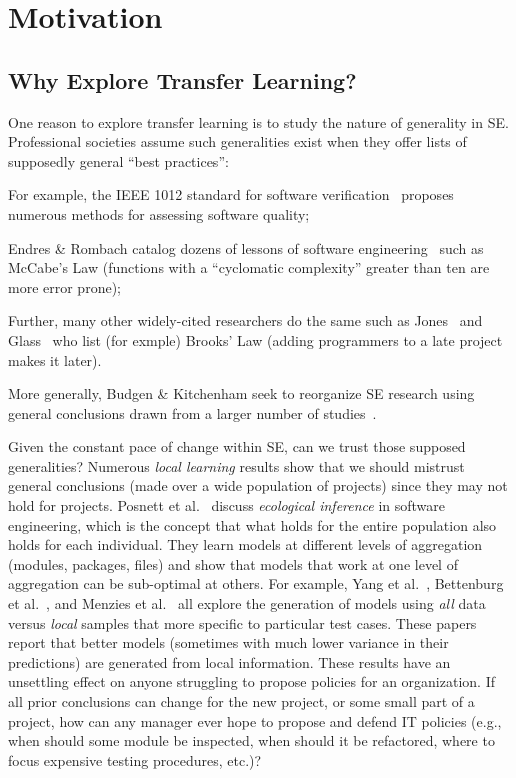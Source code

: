 \section{Motivation}
\label{sec:Motivation}

\subsection{Why Explore Transfer Learning?}
One reason to explore transfer learning
is to study the nature of
generality in SE.  Professional
societies assume such generalities exist when they
offer lists of supposedly general ``best practices'':
\squishlist
\item For example, the  IEEE 1012 standard for software
  verification~\cite{1012} proposes numerous methods for assessing software quality;
\item
 Endres \& Rombach catalog
dozens of lessons of software
engineering~\cite{endres03} such as McCabe's Law (functions with a ``cyclomatic complexity'' greater
than ten are more error prone);
\item Further, many other
widely-cited researchers do the same such as  Jones~\cite{jones10} and
Glass~\cite{glass02} who list (for exmple)
Brooks' Law (adding programmers to a late project makes it later).
\item
  More generally, Budgen \& Kitchenham seek to
reorganize SE research using general conclusions
drawn from a larger number of
studies~\cite{budgen06,budgen09}.
\squishend 

Given the constant pace of change within SE, can we trust
those supposed generalities? 
Numerous {\em local learning} results show that we
should mistrust general conclusions (made over a
wide population of projects) since they may not hold
for projects.  Posnett et al.~\cite{posnett11}
discuss {\em ecological inference} in software
engineering, which is the concept that what holds
for the entire population also holds for each
individual.  They learn models at different levels
of aggregation (modules, packages, files) and show
that models that work at one level of aggregation
can be sub-optimal at others.  For example, Yang et
al.~\cite{yang11}, Bettenburg et
al.~\cite{betten14}, and Menzies et al.~\cite{me12d}
all explore the generation of models using {\em all}
data versus {\em local} samples that more specific
to particular test cases. These papers report that
better models (sometimes with much lower variance in
their predictions) are generated from local
information.
These results have an unsettling effect on anyone
struggling to propose policies for an organization.
If all prior conclusions can change for the new
project, or some small part of a project, how can
any manager ever hope to propose and defend IT
policies (e.g., when should some module be inspected,
when should it be refactored, where to focus
expensive testing procedures, etc.)?


